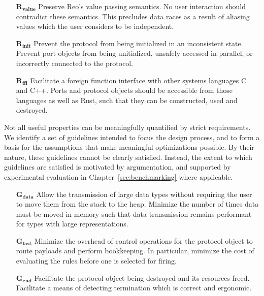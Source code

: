 \begin{enumerate}
	\item[$\boldsymbol{R_{value}}$] Preserve Reo's value passing semantics. No user interaction should contradict these semantics. This precludes data races as a result of aliasing values which the user considers to be independent.
	
	\item[$\boldsymbol{R_{init}}$] Prevent the protocol from being initialized in an inconsistent state. Prevent port objects from being unitialized, unsafely accessed in parallel, or incorrectly connected to the protocol.
	
	\item[$\boldsymbol{R_{ffi}}$] Facilitate a foreign function interface with other systems languages C and C++. Ports and protocol objects should be accessible from those languages as well as Rust, such that they can be constructed, used and destroyed.
\end{enumerate}

Not all useful properties can be meaningfully quantified by strict requirements. We identify a set of guidelines intended to focus the design process, and to form a basis for the assumptions that make meaningful optimizations possible. By their nature, these guidelines cannot be clearly satisfied. Instead, the extent to which guidelines are satisfied is motivated by argumentation, and supported by experimental evaluation in Chapter~\ref{sec:benchmarking} where applicable.

\begin{enumerate}
	\item[$\boldsymbol{G_{data}}$] Allow the transmission of large data types without requiring the user to move them from the stack to the heap. Minimize the number of times data must be moved in memory such that data transmission remains performant for types with large representations.	
	
	\item[$\boldsymbol{G_{fast}}$] Minimize the overhead of control operations for the protocol object to route payloads and perform bookkeeping. In particular, minimize the cost of evaluating the rules before one is selected for firing.
	
	\item[$\boldsymbol{G_{end}}$] Facilitate the protocol object being destroyed and its resources freed. Facilitate a means of detecting termination which is correct and ergonomic.
\end{enumerate}


